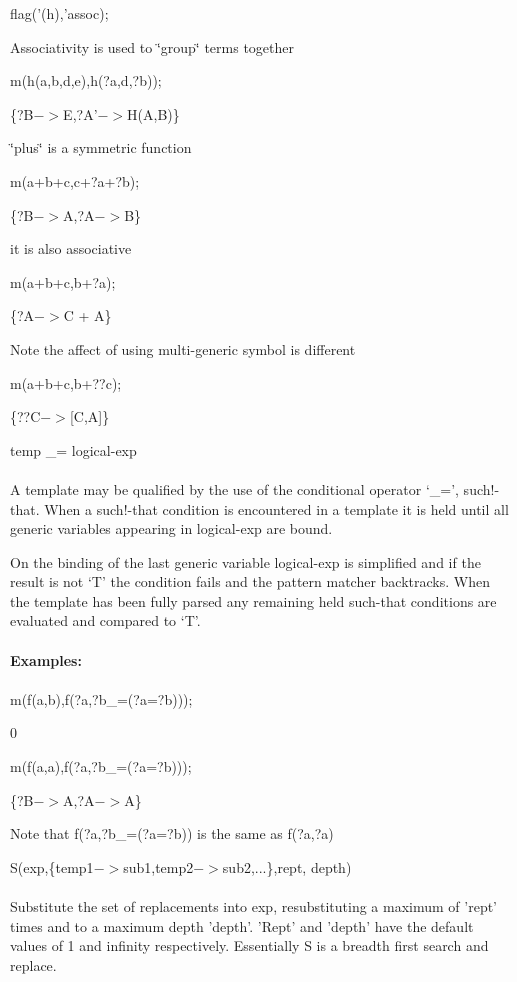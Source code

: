 \documentclass{article}
\begin{document}
 flag('(h),'assoc);

 Associativity is used to \char`\"{}group\char`\"{} terms together

 m(h(a,b,d,e),h(?a,d,?b));

 \{?B$->$E,?A'$->$H(A,B)\}



 \char`\"{}plus\char`\"{} is a symmetric function

 m(a+b+c,c+?a+?b);

 \{?B$->$A,?A$->$B\}



 it is also associative

 m(a+b+c,b+?a);

 \{?A$->$C + A\}



 Note the affect of using multi-generic symbol is different

 m(a+b+c,b+??c);

 \{??C$->${[}C,A{]}\}



temp \_= logical-exp \\
\ \\
A template may be qualified by the use of the conditional operator `\_=',
such!-that. When a such!-that condition is encountered in a template it
is held until all generic variables appearing in logical-exp are bound.

On the binding of the last generic variable logical-exp is simplified
and if the result is not `T' the condition fails and the pattern matcher
backtracks. When the template has been fully parsed any remaining held
such-that conditions are evaluated and compared to `T'. \\
\ \\
{\bf Examples:} \\
\ \\
 m(f(a,b),f(?a,?b\_=(?a=?b)));

 0


 m(f(a,a),f(?a,?b\_=(?a=?b)));

 \{?B$->$A,?A$->$A\}



 Note that f(?a,?b\_=(?a=?b)) is the same as f(?a,?a)



S(exp,\{temp1$->$sub1,temp2$->$sub2,...\},rept, depth) \\
\ \\
Substitute the set of replacements into exp, resubstituting a maximum of
'rept' times and to a maximum depth 'depth'. 'Rept' and 'depth' have the
default values of 1 and infinity respectively. Essentially S is a
breadth first search and replace.
\end{document}
